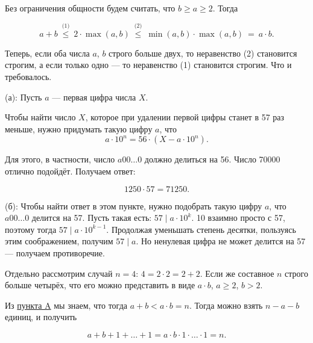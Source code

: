 \begin{itemize}

\itA \label{small-n-big-a} Без ограничения общности будем считать, что $b \geq a \geq 2$. Тогда

\vspace{-0.4cm}
$$a+b\ \stackrel{\text{(1)}}{\leq}\ 
	2 \cdot\max(a,b)\ \stackrel{\text{(2)}}{\leq}\ 
	\min(a,b) \cdot \max(a,b)\ =\ a\cdot b.$$

\noindent Теперь, если оба числа $a$, $b$ строго больше двух, то неравенство (2) становится строгим, а если только одно — то неравенство (1) становится строгим. Что и требовалось.

\itB (а): Пусть $a$ — первая цифра числа $X$.

Чтобы найти число $X$, которое при удалении первой цифры станет в 57 раз меньше, нужно придумать такую цифру $a$, что
	$$a \cdot 10^n = 56 \cdot (X - a \cdot 10^n).$$

Для этого, в частности, число $a00\ldots 0$ должно делиться на 56. Число 70000 отлично подойдёт. Получаем ответ:

\vspace{-0.4cm}
$$1250 \cdot 57 = 71250.$$

(б): Чтобы найти ответ в этом пункте, нужно подобрать такую цифру $a$, что $a00\ldots0$ делится на 57. Пусть такая есть: $57 \mid a \cdot 10^k$. 10 взаимно просто с 57, поэтому тогда $57 \mid a\cdot 10^{k-1}$. Продолжая уменьшать степень десятки, пользуясь этим соображением, получим $57 \mid a$. Но ненулевая цифра не может делится на 57 — получаем противоречие.

\itC Отдельно рассмотрим случай $n=4$: $4 = 2 \cdot 2 = 2 + 2$. Если же составное $n$ строго больше четырёх, что его можно представить в виде $a \cdot b$, $a \geq 2$, $b > 2$. 

Из \hyperref[small-n-big-a]{пункта A} мы знаем, что тогда $a+b < a \cdot b = n$. Тогда можно взять $n-a-b$ единиц, и получить

\vspace{-0.4cm}
$$a+b+1+\ldots+1 = a\cdot b \cdot 1 \cdot \ldots \cdot 1 = n.$$
\end{itemize}
